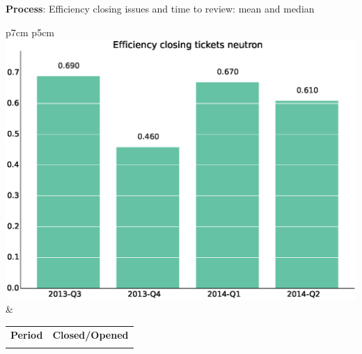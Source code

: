 \documentclass[a4wide,11pt]{report}
\begin{document}
\textbf{Process}: Efficiency closing issues and time to review: mean and median

\begin{tabular}{p{7cm} p{5cm}}
    \vspace{0pt} 
    \includegraphics[scale=.35]{figs/bmineutron.eps}
    & 
    \vspace{0pt}
    \begin{tabular}{l|l}%
    \bfseries Period & \bfseries Closed/Opened %
    \csvreader[head to column names]{data/bmineutron.csv}{}%
    {\\ & \bmi}
    \end{tabular}
\end{tabular}
\end{document}
